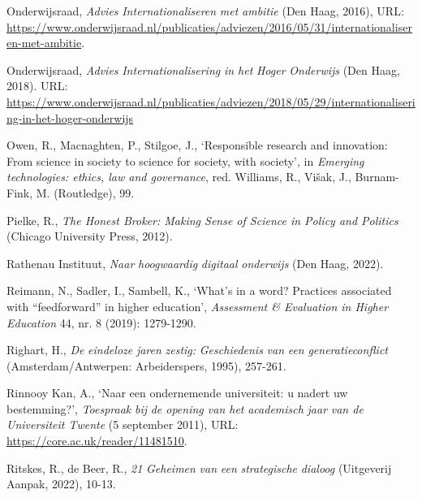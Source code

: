 \documentclass[smallauthor, chapterhaspagenum, nochapterinheader, pagenuminheader,  bigchapnum,medium2, tocpages, garamond, titleinheader]{jote-book}
\begin{document}
\begin{references}
		Onderwijsraad, \emph{Advies}\emph{ }\emph{Internationaliseren}\emph{ met }\emph{ambitie} (Den Haag, 2016), URL: \href{https://www.onderwijsraad.nl/publicaties/adviezen/2016/05/31/internationaliseren-met-ambitie}{https://www.onderwijsraad.nl/publicaties/adviezen/2016/05/31/internationaliseren-met-ambitie}.



		Onderwijsraad, \emph{Advies}\emph{ }\emph{Internationalisering}\emph{ in het }\emph{Hoger}\emph{ }\emph{Onderwijs} (Den Haag, 2018). URL: \href{https://www.onderwijsraad.nl/publicaties/adviezen/2018/05/29/internationalisering-in-het-hoger-onderwijs}{https://www.onderwijsraad.nl/publicaties/adviezen/2018/05/29/internationalisering-in-het-hoger-onderwijs}



		Owen, R., Macnaghten, P., Stilgoe, J., ‘Responsible research and innovation: From science in society to science for society, with society', in \emph{Emerging technologies: ethics, law and governance}, red. Williams, R., Višak, J., Burnam-Fink, M. (Routledge), 99.



		Pielke, R., \emph{The Honest Broker: Making Sense of Science in Policy and Politics} (Chicago University Press, 2012).



		Rathenau Instituut, \emph{Naar}\emph{ }\emph{hoogwaardig}\emph{ }\emph{digitaal}\emph{ }\emph{onderwijs} (Den Haag, 2022).



		Reimann, N., Sadler, I., Sambell, K., ‘What's in a word? Practices associated with “feedforward” in higher education', \emph{Assessment \& Evaluation in Higher Education} 44, nr. 8 (2019): 1279-1290.



		Righart, H., \emph{De }\emph{eindeloze}\emph{ }\emph{jaren}\emph{ }\emph{zestig}\emph{: }\emph{Geschiedenis}\emph{ van }\emph{een}\emph{ }\emph{generatieconflict} (Amsterdam/Antwerpen: Arbeiderspers, 1995), 257-261.



		Rinnooy Kan, A., ‘Naar een ondernemende universiteit: u nadert uw bestemming?', \emph{Toespraak}\emph{ }\emph{bij}\emph{ de opening van het }\emph{academisch}\emph{ }\emph{jaar}\emph{ van de Universiteit Twente} (5 september 2011), URL: \href{https://core.ac.uk/reader/11481510}{https://core.ac.uk/reader/11481510}.



		Ritskes, R., de Beer, R., \emph{21 }\emph{Geheimen}\emph{ van }\emph{een}\emph{ }\emph{strategische}\emph{ }\emph{dialoog} (Uitgeverij Aanpak, 2022), 10-13.




\end{references}
\end{document}
